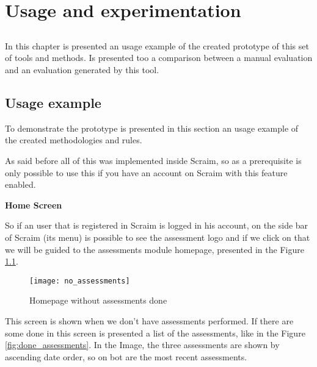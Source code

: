 \chapter{Usage and experimentation} \label{chap:usage}

\section*{}

In this chapter is presented an usage example of the created prototype of this set of tools and methods. Is presented too a comparison between a manual evaluation and an evaluation generated by this tool.

\section{Usage example} \label{sec:usageexample}

To demonstrate the prototype is presented in this section an usage example of the created methodologies and rules.

As said before all of this was implemented inside Scraim, so as a prerequisite is only possible to use this if you have an account on Scraim with this feature enabled.

\vspace{10 mm}

\textbf{Home Screen}

So if an user that is registered in Scraim is logged in his account, on the side bar of Scraim (its menu) is possible to see the assessment logo and if we click on that we will be guided to the assessments module homepage, presented in the Figure \ref{fig:no_assessments}.

\begin{figure}[h]
	\begin{center}
		\leavevmode
		\texttt{[image: no\_assessments]}
		\caption{Homepage without assessments done}
		\label{fig:no_assessments}
	\end{center}
\end{figure}

This screen is shown when we don't have assessments performed. If there are some done in this screen is presented a list of the assessments, like in the Figure \ref{fig:done_assessments}. In the Image, the three assessments are shown by ascending date order, so on bot are the most recent assessments.

